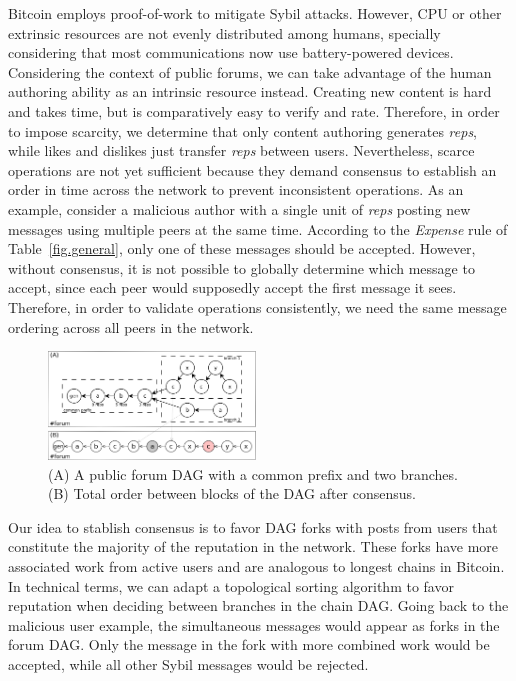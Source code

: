 \documentclass[12pt]{article}
\newcommand{\reps}     {\emph{reps}\xspace}
\begin{document}
Bitcoin employs proof-of-work to mitigate Sybil attacks.
However, CPU or other extrinsic resources are not evenly distributed among
humans, specially considering that most communications now use
battery-powered devices.
%
Considering the context of public forums, we can take advantage of the human
authoring ability as an intrinsic resource instead.
Creating new content is hard and takes time, but is comparatively easy to
verify and rate.
Therefore, in order to impose scarcity, we determine that only content
authoring generates \reps, while likes and dislikes just transfer \reps between
users.
%
Nevertheless, scarce operations are not yet sufficient because they demand
consensus to establish an order in time across the network to prevent
inconsistent operations.
As an example, consider a malicious author with a single unit of \reps posting
new messages using multiple peers at the same time.
According to the \emph{Expense} rule of Table~\ref{fig.general}, only one of
these messages should be accepted.
However, without consensus, it is not possible to globally determine which
message to accept, since each peer would supposedly accept the first message it
sees.
Therefore, in order to validate operations consistently, we need the same
message ordering across all peers in the network.

\begin{figure}
\centering
\includegraphics[width=0.49\textwidth]{reps2.png}
\caption{
    (A) A public forum DAG with a common prefix and two branches.
    (B) Total order between blocks of the DAG after consensus.
}
\label{fig.reps}
\end{figure}

Our idea to stablish consensus is to favor DAG forks with posts from users that
constitute the majority of the reputation in the network.
These forks have more associated work from active users and are analogous to
longest chains in Bitcoin.
In technical terms, we can adapt a topological sorting algorithm to favor
reputation when deciding between branches in the chain DAG.
%
Going back to the malicious user example, the simultaneous messages would
appear as forks in the forum DAG.
Only the message in the fork with more combined work would be accepted, while
all other Sybil messages would be rejected.
\end{document}
